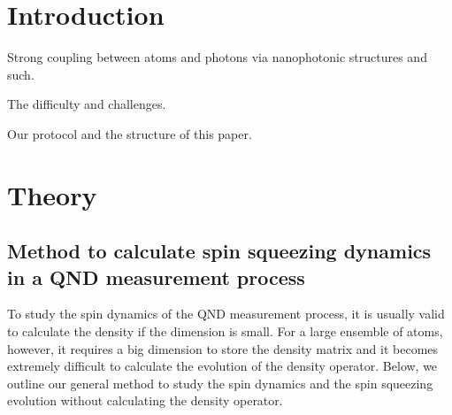 \documentclass[preprint,aps,pra,onecolumn,superscriptaddress]{revtex4-1} %
\begin{document}
\section{Introduction}

Strong coupling between atoms and photons via nanophotonic structures and such.

The difficulty and challenges.

Our protocol and the structure of this paper.


\section{Theory} \label{Sec::Theory}

\subsection{Method to calculate spin squeezing dynamics in a QND measurement process}
To study the spin dynamics of the QND measurement process, it is usually valid to calculate the density if the dimension is small. 
For a large ensemble of atoms, however, it requires a big dimension to store the density matrix and it becomes extremely difficult to calculate the evolution of the density operator.
Below, we outline our general method to study the spin dynamics and the spin squeezing evolution without calculating the density operator.
\end{document}
